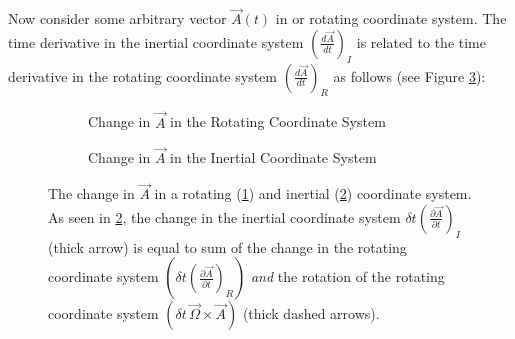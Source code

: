Now consider some arbitrary vector $\vec{A}(t)$ in or rotating coordinate system. The time derivative in the inertial coordinate system $\left(\frac{d\vec{A}}{dt}\right)_I$ is related to the time derivative in the rotating coordinate system $\left(\frac{d\vec{A}}{dt}\right)_R$ as follows (see Figure \ref{Inertial to Rotating}):
\begin{figure}
    \centering
    \begin{subfigure}{0.4\linewidth}
        \centering
        \caption{Change in $\vec{A}$ in the Rotating Coordinate System}
        \label{Rotating}
    \end{subfigure}
    \hfill
    \begin{subfigure}{0.4\linewidth}
        \centering
        \caption{Change in $\vec{A}$ in the Inertial Coordinate System}
        \label{Inertial}
    \end{subfigure}
    \caption{The change in $\vec{A}$ in a rotating (\ref{Rotating}) and inertial (\ref{Inertial}) coordinate system. As seen in \ref{Inertial}, the change in the inertial coordinate system $\delta t \left( \frac{\partial \vec{A}}{\partial t} \right)_I$ (thick arrow) is equal to sum of the change in the rotating coordinate system $\left( \delta t \left( \frac{\partial \vec{A}}{\partial t} \right)_R \right)$ \textit{and} the rotation of the rotating coordinate system $\left(\delta t\,\vec{\Omega}\times\vec{A} \right)$ (thick dashed arrows).}
    \label{Inertial to Rotating}
\end{figure}
